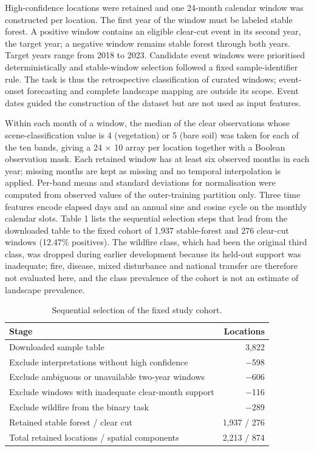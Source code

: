 \documentclass[10pt,a4paper,twocolumn]{article}
\begin{document}
High-confidence locations were retained and one 24-month calendar window was constructed per location. The first year of the window must be labeled stable forest. A positive window contains an eligible clear-cut event in its second year, the target year; a negative window remains stable forest through both years. Target years range from 2018 to 2023. Candidate event windows were prioritised deterministically and stable-window selection followed a fixed sample-identifier rule. The task is thus the retrospective classification of curated windows; event-onset forecasting and complete landscape mapping are outside its scope. Event dates guided the construction of the dataset but are not used as input features.

Within each month of a window, the median of the clear observations whose scene-classification value is 4 (vegetation) or 5 (bare soil) was taken for each of the ten bands, giving a 24 $\times$ 10 array per location together with a Boolean observation mask. Each retained window has at least six observed months in each year; missing months are kept as missing and no temporal interpolation is applied. Per-band means and standard deviations for normalisation were computed from observed values of the outer-training partition only. Three time features encode elapsed days and an annual sine and cosine cycle on the monthly calendar slots. Table 1 lists the sequential selection steps that lead from the downloaded table to the fixed cohort of 1,937 stable-forest and 276 clear-cut windows (12.47\% positives). The wildfire class, which had been the original third class, was dropped during earlier development because its held-out support was inadequate; fire, disease, mixed disturbance and national transfer are therefore not evaluated here, and the class prevalence of the cohort is not an estimate of landscape prevalence.

\begin{table}[tbp]
\centering
\small
\caption{Sequential selection of the fixed study cohort.}
\begin{tabular}{lr}
\toprule
Stage & Locations \\ \midrule
Downloaded sample table & 3,822 \\
Exclude interpretations without high confidence & $-$598 \\
Exclude ambiguous or unavailable two-year windows & $-$606 \\
Exclude windows with inadequate clear-month support & $-$116 \\
Exclude wildfire from the binary task & $-$289 \\
Retained stable forest / clear cut & 1,937 / 276 \\
Total retained locations / spatial components & 2,213 / 874 \\
\bottomrule
\end{tabular}
\end{table}
\end{document}
